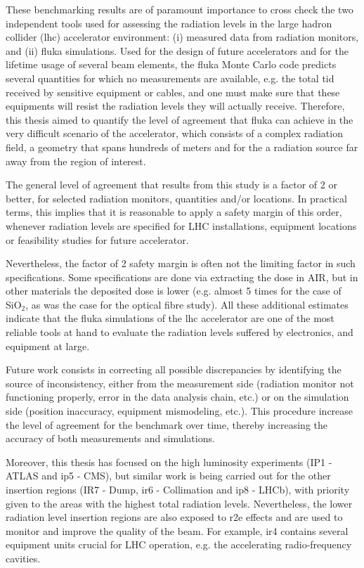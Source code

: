 \documentclass[encoding=utf8,british]{tumphthesis}
\begin{document}
These benchmarking results are of paramount importance to cross check the two independent tools used for assessing the radiation levels in the large hadron collider (\acrshort{lhc}) accelerator environment: (i) measured data from radiation monitors, and (ii) \acrshort{fluka} simulations. Used for the design of future accelerators and for the lifetime usage of several beam elements, the \acrshort{fluka} Monte Carlo code predicts several quantities for which no measurements are available, e.g. the total \acrshort{tid} received by sensitive equipment or cables, and one must make sure that these equipments will resist the radiation levels they will actually receive. Therefore, this thesis aimed to quantify the level of agreement that \acrshort{fluka} can achieve in the very difficult scenario of the accelerator, which consists of a complex radiation field, a geometry that spans hundreds of meters and for the a radiation source far away from the region of interest.

The general level of agreement that results from this study is a factor of 2 or better, for selected radiation monitors, quantities and/or locations. In practical terms, this implies that it is reasonable to apply a safety margin of this order, whenever radiation levels are specified for LHC installations, equipment locations or feasibility studies for future accelerator. 

Nevertheless, the factor of 2 safety margin is often not the limiting factor in such specifications. Some specifications are done via extracting the dose in AIR, but in other materials the deposited dose is lower (e.g. almost 5 times for the case of SiO$_2$, as was the case for the optical fibre study). All these additional estimates indicate that the \acrshort{fluka} simulations of the \acrshort{lhc} accelerator are one of the most reliable tools at hand to evaluate the radiation levels suffered by electronics, and equipment at large.

Future work consists in correcting all possible discrepancies by identifying the source of inconsistency, either from the measurement side (radiation monitor not functioning properly, error in the data analysis chain, etc.) or on the simulation side (position inaccuracy, equipment mismodeling, etc.). This procedure increase the level of agreement for the benchmark over time, thereby increasing the accuracy of both measurements and simulations.

Moreover, this thesis has focused on the high luminosity experiments (IP1 - ATLAS and \acrshort{ip}5 - CMS), but similar work is being carried out for the other insertion regions (IR7 - Dump, \acrshort{ir}6 - Collimation and \acrshort{ip}8 - LHCb), with priority given to the areas with the highest total radiation levels. Nevertheless, the lower radiation level insertion regions are also exposed to \acrshort{r2e} effects and are used to monitor and improve the quality of the beam. For example, \acrshort{ir}4 contains several equipment units crucial for LHC operation, e.g. the accelerating radio-frequency cavities.
\end{document}
